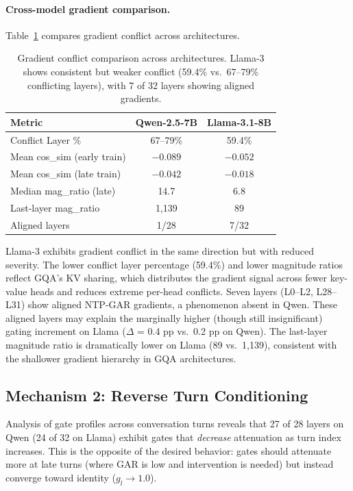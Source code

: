 \documentclass[11pt,a4paper]{article}
\begin{document}
\paragraph{Cross-model gradient comparison.}
Table~\ref{tab:grad_cross} compares gradient conflict across architectures.

\begin{table}[t]
\centering
\caption{Gradient conflict comparison across architectures. Llama-3 shows consistent but weaker conflict (59.4\% vs.\ 67--79\% conflicting layers), with 7 of 32 layers showing aligned gradients.}
\label{tab:grad_cross}
\begin{tabular}{lcc}
\toprule
\textbf{Metric} & \textbf{Qwen-2.5-7B} & \textbf{Llama-3.1-8B} \\
\midrule
Conflict Layer \%           & 67--79\%  & 59.4\% \\
Mean cos\_sim (early train) & $-0.089$  & $-0.052$ \\
Mean cos\_sim (late train)  & $-0.042$  & $-0.018$ \\
Median mag\_ratio (late)    & 14.7      & 6.8 \\
Last-layer mag\_ratio       & 1,139     & 89 \\
Aligned layers              & 1/28      & 7/32 \\
\bottomrule
\end{tabular}
\end{table}

Llama-3 exhibits gradient conflict in the same direction but with reduced severity. The lower conflict layer percentage (59.4\%) and lower magnitude ratios reflect GQA's KV sharing, which distributes the gradient signal across fewer key-value heads and reduces extreme per-head conflicts. Seven layers (L0--L2, L28--L31) show aligned NTP-GAR gradients, a phenomenon absent in Qwen. These aligned layers may explain the marginally higher (though still insignificant) gating increment on Llama ($\Delta$ = 0.4 pp vs.\ 0.2 pp on Qwen). The last-layer magnitude ratio is dramatically lower on Llama (89 vs.\ 1,139), consistent with the shallower gradient hierarchy in GQA architectures.

\subsection{Mechanism 2: Reverse Turn Conditioning}

Analysis of gate profiles across conversation turns reveals that 27 of 28 layers on Qwen (24 of 32 on Llama) exhibit gates that \emph{decrease} attenuation as turn index increases. This is the opposite of the desired behavior: gates should attenuate more at late turns (where GAR is low and intervention is needed) but instead converge toward identity ($g_l \to 1.0$).
\end{document}
